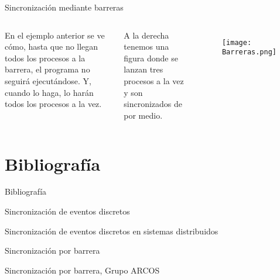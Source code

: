 \documentclass{beamer}
\begin{document}
\begin{frame}{Sincronización mediante barreras}

\begin{columns}
	En el ejemplo anterior se ve cómo, hasta que no llegan todos los procesos a la barrera, el programa no seguirá ejecutándose. Y, cuando lo haga, lo harán todos los procesos a la vez.
	
	\vspace{0.5cm}
	A la derecha tenemos una figura donde se lanzan tres procesos a la vez y son sincronizados de por medio.
	\begin{figure}[h]
		\centering
		\texttt{[image: Barreras.png]}
	\end{figure}
\end{columns}
\end{frame}

\section{Bibliografía}

\begin{frame}{Bibliografía}

\begin{thebibliography}{10}
	
%	
	
	
	\beamertemplatearticlebibitems
	
	
	
	Sincronización de eventos discretos
	
	Sincronización de eventos discretos en sistemas distribuidos
	
	Sincronización por barrera
	
	Sincronización por barrera, Grupo ARCOS
	
	
\end{thebibliography}
\end{frame}
\end{document}
